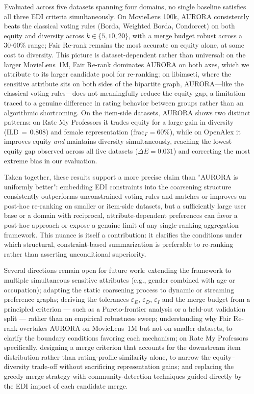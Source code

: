 \documentclass[a4paper,fleqn]{cas-dc}
\begin{document}
Evaluated across five datasets spanning four domains, no single baseline
satisfies all three EDI criteria simultaneously. On MovieLens 100k, AURORA
consistently beats the classical voting rules (Borda, Weighted Borda, Condorcet)
on both equity and diversity across $k \in \{5,10,20\}$, with a merge budget
robust across a 30-60\% range; Fair Re-rank remains the most accurate on equity
alone, at some cost to diversity. This picture is dataset-dependent rather than
universal: on the larger MovieLens~1M, Fair Re-rank dominates AURORA on both
axes, which we attribute to its larger candidate pool for re-ranking; on
libimseti, where the sensitive attribute sits on both sides of the bipartite
graph, AURORA—like the classical voting rules—does not meaningfully reduce
the equity gap, a limitation traced to a genuine difference in rating behavior
between groups rather than an algorithmic shortcoming. On the item-side datasets, AURORA shows
two distinct patterns: on Rate My Professors it trades equity for a large gain
in diversity (ILD\,$=$\,0.808) and female representation ($\mathrm{frac}_F=60\%$),
while on OpenAlex it improves equity \emph{and} maintains diversity
simultaneously, reaching the lowest equity gap observed across all five datasets
($\Delta E = 0.031$) and correcting the most extreme bias in our evaluation.

Taken together, these results support a more precise claim than "AURORA is
uniformly better": embedding EDI constraints into the coarsening structure
consistently outperforms unconstrained voting rules and matches or improves
on post-hoc re-ranking on smaller or item-side datasets, but a sufficiently
large user base or a domain with reciprocal, attribute-dependent preferences
can favor a post-hoc approach or expose a genuine limit of any single-ranking
aggregation framework. This nuance is itself a contribution: it clarifies the
conditions under which structural, constraint-based summarization is
preferable to re-ranking rather than asserting unconditional superiority.

Several directions remain open for future work: extending the framework to
multiple simultaneous sensitive attributes (e.g., gender combined with age or
occupation); adapting the static coarsening process to dynamic or streaming
preference graphs; deriving the tolerances $\varepsilon_E$, $\varepsilon_D$,
$\varepsilon_I$ and the merge budget from a principled criterion — such as a
Pareto-frontier analysis or a held-out validation split — rather than an
empirical robustness sweep; understanding why Fair Re-rank overtakes AURORA on
MovieLens~1M but not on smaller datasets, to clarify the boundary conditions
favoring each mechanism; on Rate My Professors specifically, designing a merge
criterion that accounts for the downstream item distribution rather than
rating-profile similarity alone, to narrow the equity–diversity trade-off
without sacrificing representation gains; and replacing the greedy merge
strategy with community-detection techniques guided directly by the EDI impact
of each candidate merge.

%



\end{document}
